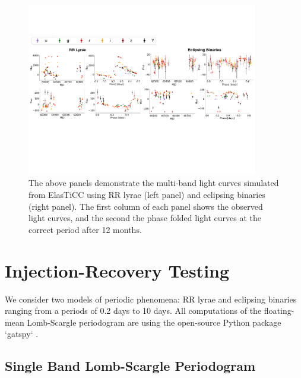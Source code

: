 \documentclass[DM,authoryear,toc]{lsstdoc}
\begin{document}
\begin{figure}
  \includegraphics[width=0.9\textwidth]{figures/lightcurve_demo.pdf}
  \centering 
  \caption{The above panels demonstrate the multi-band light curves simulated from ElasTiCC using RR lyrae (left panel) and eclipsing binaries (right panel). The first column of each panel shows the observed light curves, and the second the phase folded light curves at the correct period after 12 months.}
   \label{fig:light_curve_demo}
\end{figure}


\section{Injection-Recovery Testing}
We consider two models of periodic phenomena: RR lyrae and eclipsing binaries ranging from a periods of 0.2 days to 10 days. All computations of the floating-mean Lomb-Scargle periodogram are using the open-source Python package `gatspy` \citet{VanderPlas:VP2015}. 


\subsection{Single Band Lomb-Scargle Periodogram}
\end{document}
